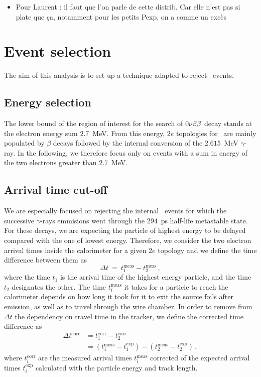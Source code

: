 \begin{itemize}
\item Pour Laurent : il faut que l'on parle de cette distrib. Car elle n'est pas si plate que ça, notamment pour les petits Pexp, on a comme un excès
\end{itemize}


\section{Event selection}

The aim of this analysis is to set up a technique adapted to reject \Tl\ events.

\subsection{Energy selection}

The lower bound of the region of interest for the search of $0\nu\beta\beta$ decay stands at the electron energy sum $2.7$~MeV.
From this energy, $2e$ topologies for \Tl\ are mainly populated by $\beta$ decays followed by the internal conversion of the $2.615$~MeV $\gamma$-ray.
In the following, we therefore focus only on events with a sum in energy of the two electrons greater than $2.7$~MeV.

\subsection{Arrival time cut-off}

We are especially focused on rejecting the internal \Tl\ events for which the successive $\gamma$-rays emmisions went through the $294$~ps half-life metastable state.
For these decays, we are expecting the particle of highest energy to be delayed compared with the one of lowest energy.
Therefore, we consider the two electron arrival times inside the calorimeter for a given $2e$ topology and we define the time difference between them as
\begin{equation}
\Delta t~=~t^{\text{meas}}_{1}-t^{\text{meas}}_{2}\,,
\end{equation}
where the time $t_{1}$ is the arrival time of the highest energy particle, and the time $t_{2}$ designates the other.
The time $t_{i}^{\text{meas}}$ it takes for a particle to reach the calorimeter depends on how long it took for it to exit the source foils after emission, as well as to travel through the wire chamber.
In order to remove from $\Delta t$ the dependency on travel time in the tracker, we define the corrected time difference as
\begin{align}
  \Delta t^{\text{corr}} & = t^{\text{corr}}_{1} - t^{\text{corr}}_{2}\\
  & = (t^{\text{meas}}_{1} - t^{\text{exp}}_{1}) - (t^{\text{meas}}_{2} - t^{\text{exp}}_{2})\,,
\end{align}
where $t^{\text{corr}}_{i}$ are the measured arrival times $t^{\text{meas}}_{i}$ corrected of the expected arrival times $t^{\text{exp}}_{i}$ calculated with the particle energy and track length.

